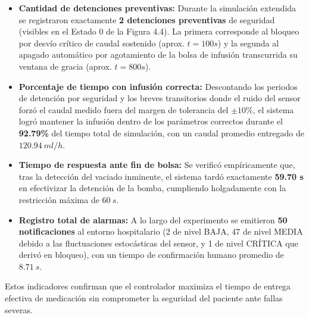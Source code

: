 \begin{itemize}
    \item \textbf{Cantidad de detenciones preventivas:} Durante la simulación extendida se registraron exactamente \textbf{2 detenciones preventivas} de seguridad (visibles en el Estado 0 de la Figura 4.4). La primera corresponde al bloqueo por desvío crítico de caudal sostenido (aprox. $t=100s$) y la segunda al apagado automático por agotamiento de la bolsa de infusión transcurrida su ventana de gracia (aprox. $t=800s$).
    
    \item \textbf{Porcentaje de tiempo con infusión correcta:} Descontando los periodos de detención por seguridad y los breves transitorios donde el ruido del sensor forzó el caudal medido fuera del margen de tolerancia del $\pm 10\%$, el sistema logró mantener la infusión dentro de los parámetros correctos durante el \textbf{92.79\%} del tiempo total de simulación, con un caudal promedio entregado de $120.94~ml/h$.

    \item \textbf{Tiempo de respuesta ante fin de bolsa:} Se verificó empíricamente que, tras la detección del vaciado inminente, el sistema tardó exactamente \textbf{59.70 s} en efectivizar la detención de la bomba, cumpliendo holgadamente con la restricción máxima de $60~s$.
    
    \item \textbf{Registro total de alarmas:} A lo largo del experimento se emitieron \textbf{50 notificaciones} al entorno hospitalario (2 de nivel BAJA, 47 de nivel MEDIA debido a las fluctuaciones estocásticas del sensor, y 1 de nivel CRÍTICA que derivó en bloqueo), con un tiempo de confirmación humano promedio de $8.71~s$.
\end{itemize}

Estos indicadores confirman que el controlador maximiza el tiempo de entrega efectiva de medicación sin comprometer la seguridad del paciente ante fallas severas.